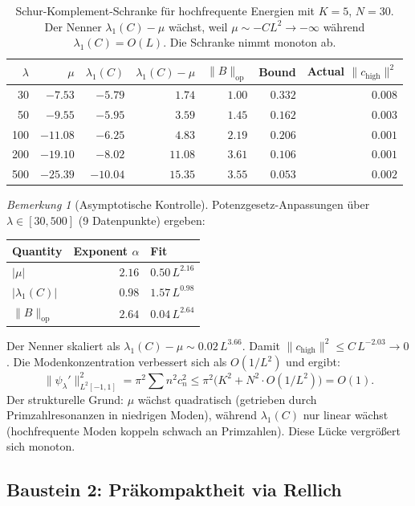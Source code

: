 ﻿\documentclass[12pt,a4paper]{article}
\theoremstyle{definition}
\theoremstyle{remark}
\newtheorem{remark}[theorem]{Bemerkung}
\begin{document}
\begin{table}[h]
\centering
\small
\renewcommand{\arraystretch}{1.15}
\begin{tabular}{r|r|r|r|r|r|r}
$\lambda$ & $\mu$ & $\lambda_1(C)$ & $\lambda_1(C) - \mu$ & $\|B\|_{\mathrm{op}}$ & Bound & Actual $\|c_{\mathrm{high}}\|^2$ \\\hline
30  & $-7.53$  & $-5.79$ & $1.74$  & $1.00$ & $0.332$ & $0.008$ \\
50  & $-9.55$  & $-5.95$ & $3.59$  & $1.45$ & $0.162$ & $0.003$ \\
100 & $-11.08$ & $-6.25$ & $4.83$  & $2.19$ & $0.206$ & $0.001$ \\
200 & $-19.10$ & $-8.02$ & $11.08$ & $3.61$ & $0.106$ & $0.001$ \\
500 & $-25.39$ & $-10.04$ & $15.35$ & $3.55$ & $0.053$ & $0.002$
\end{tabular}
\caption{Schur-Komplement-Schranke für hochfrequente Energien mit $K = 5$, $N = 30$. Der Nenner $\lambda_1(C) - \mu$ wächst, weil $\mu \sim -CL^2 \to -\infty$ während $\lambda_1(C) = O(L)$. Die Schranke nimmt monoton ab.}
\label{tab:schur}
\end{table}

\begin{remark}[Asymptotische Kontrolle]
Potenzgesetz-Anpassungen über $\lambda \in [30, 500]$ (9 Datenpunkte) ergeben:
\begin{center}
\begin{tabular}{l|r|l}
Quantity & Exponent $\alpha$ & Fit \\\hline
$|\mu|$ & $2.16$ & $0.50\,L^{2.16}$ \\
$|\lambda_1(C)|$ & $0.98$ & $1.57\,L^{0.98}$ \\
$\|B\|_{\mathrm{op}}$ & $2.64$ & $0.04\,L^{2.64}$
\end{tabular}
\end{center}
Der Nenner skaliert als $\lambda_1(C)-\mu \sim 0.02\,L^{3.66}$. Damit
$\|c_{\mathrm{high}}\|^2 \leq C\,L^{-2.03}\to 0$.
Die Modenkonzentration verbessert sich als $O(1/L^2)$ und ergibt:
\[
  \|\psi_\lambda'\|_{L^2[-1,1]}^2 = \pi^2 \sum n^2 c_n^2 \leq \pi^2\bigl(K^2 + N^2 \cdot O(1/L^2)\bigr) = O(1).
\]
Der strukturelle Grund: $\mu$ wächst quadratisch (getrieben durch Primzahlresonanzen in niedrigen Moden), während $\lambda_1(C)$ nur linear wächst (hochfrequente Moden koppeln schwach an Primzahlen). Diese Lücke vergrößert sich monoton.
\end{remark}

\subsection{Baustein 2: Pr\"akompaktheit via Rellich}
\end{document}

